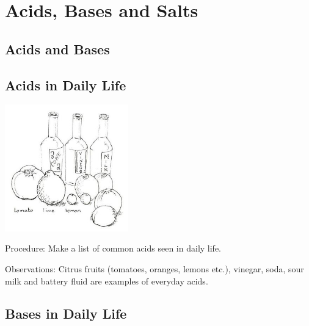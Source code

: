 \section{Acids, Bases and Salts}

\begin{multicols}{2}


\section*{Acids and Bases}


\subsection{Acids in Daily Life}

\begin{center}
\includegraphics[width=0.4\textwidth]{./img/source/acids-daily.jpg}
\end{center}

\begin{description*}
\item[Procedure:]{Make a list of common acids seen in daily life.}
\item[Observations:]{Citrus fruits (tomatoes, oranges, lemons etc.), vinegar, soda, sour milk and battery fluid are examples of everyday acids.}
\end{description*}

\subsection{Bases in Daily Life}


\end{multicols}
